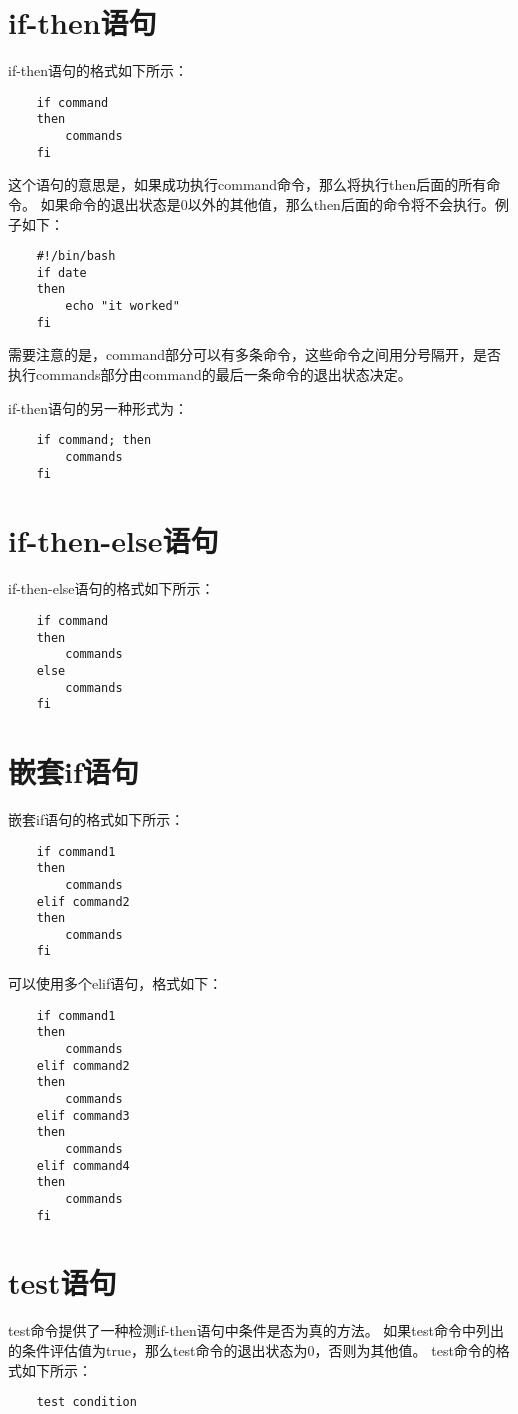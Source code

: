 \documentclass[a4paper,left=1.5cm,right=1.5cm,11pt]{article}
\begin{document}
\tableofcontents

\clearpage

\section{if-then语句}
	if-then语句的格式如下所示：
	\begin{lstlisting}
	if command
	then
		commands
	fi
	\end{lstlisting}

	这个语句的意思是，如果成功执行command命令，那么将执行then后面的所有命令。
	如果命令的退出状态是0以外的其他值，那么then后面的命令将不会执行。例子如下：
	\begin{lstlisting}
	#!/bin/bash
	if date
	then
		echo "it worked"
	fi
	\end{lstlisting}

	需要注意的是，command部分可以有多条命令，这些命令之间用分号隔开，是否执行commands部分由command的最后一条命令的退出状态决定。\par

	if-then语句的另一种形式为：
	\begin{lstlisting}
	if command; then
		commands
	fi
	\end{lstlisting}

\section{if-then-else语句}
	if-then-else语句的格式如下所示：
	\begin{lstlisting}
	if command
	then
		commands
	else
		commands
	fi
	\end{lstlisting}

\section{嵌套if语句}
	嵌套if语句的格式如下所示：
	\begin{lstlisting}
	if command1
	then
		commands
	elif command2
	then
		commands
	fi
	\end{lstlisting}

	可以使用多个elif语句，格式如下：
	\begin{lstlisting}
	if command1
	then
		commands
	elif command2
	then
		commands
	elif command3
	then
		commands
	elif command4
	then
		commands
	fi
	\end{lstlisting}

\section{test语句}
	test命令提供了一种检测if-then语句中条件是否为真的方法。
	如果test命令中列出的条件评估值为true，那么test命令的退出状态为0，否则为其他值。
	test命令的格式如下所示：
	\begin{lstlisting}
	test condition
	\end{lstlisting}
\end{document}
